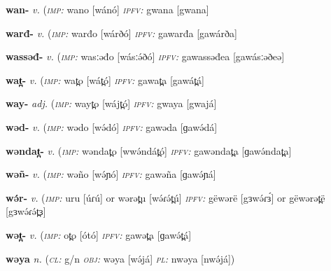 \newentry
\headword\textbf{wan-}  
\ipa{[wán-]}
\synpos\textit{v.} 
\imperative(\textit {\textsc{imp:}} wano [wánó]
\imperfective\textit{\textsc{ipfv:}} gwana [gwana] 

\newentry
\headword\textbf{warđ-}  
\ipa{[wárð-]}
\synpos\textit{v.} 
\imperative(\textit {\textsc{imp:}} warđo [wárðó]
\imperfective\textit{\textsc{ipfv:}} gawarđa [gawárða] 

\newentry
\headword\textbf{wassəđ-}  
\ipa{[wásːəð-]}
\synpos\textit{v.} 
\imperative(\textit {\textsc{imp:}} wasːəđo [wásːə́ðó]
\imperfective\textit{\textsc{ipfv:}} gawassəđea [gawásːəðeə] 


\newentry
\headword\textbf{wat̪-}  
\ipa{[wát̪-]}
\synpos\textit{v.} 
\imperative(\textit {\textsc{imp:}} wat̪o [wát̪ó]
\imperfective\textit{\textsc{ipfv:}} gawat̪a [gawát̪á] 

\newentry
\headword\textbf{way-}  
\ipa{[wáj-]}
\synpos\textit{adj.} 
\imperative(\textit {\textsc{imp:}} wayt̪o [wájt̪ó]
\imperfective\textit{\textsc{ipfv:}} gwaya [gwajá] 

\newentry
\headword\textbf{wəd-}  
\ipa{[wə́d-]}
\synpos\textit{v.} 
\imperative(\textit {\textsc{imp:}} wədo [wə́dó]
\imperfective\textit{\textsc{ipfv:}} gawəda [ɡawə́dá] 

\newentry
\headword\textbf{wəndat̪-}  
\ipa{[wə́ndat̪-]}
\synpos\textit{v.} 
\imperative(\textit {\textsc{imp:}} wəndat̪o [wwə́ndát̪ó]
\imperfective\textit{\textsc{ipfv:}} gawəndat̪a [ɡawə́ndat̪a] 

\newentry
\headword\textbf{wəñ-}  
\ipa{[wə́ɲ-]}
\synpos\textit{v.} 
\imperative(\textit {\textsc{imp:}} wəño [wə́ɲó]
\imperfective\textit{\textsc{ipfv:}} gawəña [ɡawə́ɲá] 

\newentry
\headword\textbf{wə́r-}  
\ipa{[wɘ́ɾ-]}
\synpos\textit{v.} 
\imperative(\textit {\textsc{imp:}} uru [úɾú] or wərət̪u [wə́ɾə́t̪ú]
\imperfective\textit{\textsc{ipfv:}} gëwərë [gɜwə́ɾɜ́] or gëwərət̪ë [gɜwə́ɾə́t̪ɜ]

\newentry
\headword\textbf{wət̪-}  
\ipa{[wə́t̪-]}
\synpos\textit{v.} 
\imperative(\textit {\textsc{imp:}} ot̪o [ótó]
\imperfective\textit{\textsc{ipfv:}} gawət̪a [ɡawə́t̪á] 

\newentry
\headword\textbf{wəya}  
\ipa{[wə́já]}
\synpos\textit{n.} 
\class(\textit{\textsc{cl:}} {g/n}
\object\textit{\textsc{obj:}} wəya [wə́já]
\plural\textit{\textsc{pl:}} nwəya [nwə́já])


